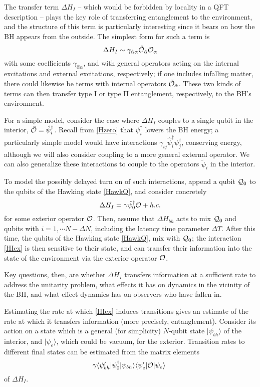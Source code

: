 \documentclass[12pt]{article}
\numberwithin{equation}{section}
\newcommand{\calo}{{\cal O}}
\newcommand{\calq}{{\cal Q}}
\newcommand{\beq}{\begin{equation}}
\newcommand{\eeq}{\end{equation}}
\begin{document}
The transfer term $\Delta H_I$ -- which would be forbidden by locality in a QFT description -- plays the key role of transferring entanglement to the environment, and the structure of this term is particularly interesting since it bears on how the BH appears from the outside.  The simplest form for such a term is
\beq
\Delta H_I \sim \gamma_{\hat \alpha\alpha}  \hat \calo_{\hat \alpha} \calo_\alpha
\eeq
with some coefficients $\gamma_{\hat \alpha\alpha}$, and with general operators acting on the internal excitations and external excitations, respectively; if one includes infalling matter, there could likewise be terms with internal operators $\tilde\calo_{\tilde \alpha}$.  These two kinds of terms can then transfer type I or type II entanglement, respectively, to the BH's environment.

For a  simple model, consider the case where $\Delta H_I$ couples to a single qubit in the interior, $\hat \calo = \hat \psi_i^\dagger$.  Recall from \eqref{Hzero} that $\psi_i^\dagger$ lowers the BH energy; a particularly simple model would have interactions $\gamma_{ij} \hat \psi_i^\dagger \psi_j^\dagger$, conserving energy, although we will also consider coupling to a more general external operator.  We can also generalize these interactions to couple to the operators $\tilde \psi_i$ in the interior.  

To model the possibly delayed turn on of such interactions, append a qubit $\calq_0$ to the qubits of the Hawking state \eqref{HawkQ}, and consider concretely  
\beq\label{HIex}
\Delta H_I = \gamma \hat \psi_0^\dagger \calo + h.c.
\eeq
for some exterior operator $\calo$.  Then, assume that $\Delta H_{bh}$ acts to mix $\calq_0$ and  qubits with $i=1,\cdots N-\Delta N$, including the latency time  parameter $\Delta T$.  
After this time, the qubits of the Hawking state \eqref{HawkQ}, mix with $\calq_0$; the interaction \eqref{HIex}  is then sensitive to their state, and can transfer their information into the state of the environment via the exterior operator $\calo$.

Key questions, then, are whether $\Delta H_I$ transfers information at a sufficient rate to address the unitarity problem, what effects it has on dynamics in the vicinity of the BH, and what effect dynamics  has on observers who have fallen in.

Estimating the rate at which \eqref{HIex} induces transitions gives an estimate of the rate at which it transfers information (more precisely, entanglement)\cite{NVU,GiRo}.  Consider its action on a state which is a general (for simplicity) $N$-qubit state $|\psi_{bh}\rangle$ of the interior, and $|\psi_e\rangle$, which could be vacuum, for the exterior.  Transition rates to different final states can be estimated from the matrix elements
\beq\label{matel}
\gamma  \langle \psi_{bh}'| \psi_0^\dagger |\psi_{bh}\rangle    \langle\psi_e'|   \calo |\psi_e\rangle\ 
\eeq
of $\Delta H_I$.
\end{document}
